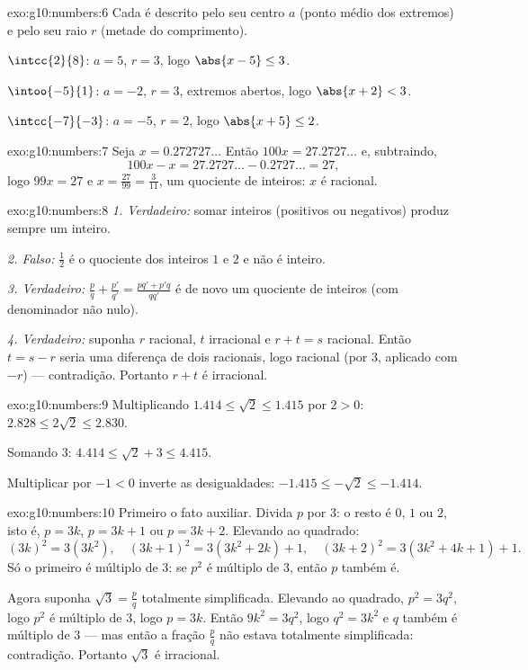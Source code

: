 \begin{solution}{exo:g10:numbers:6}
Cada  é descrito pelo seu centro $a$ (ponto médio dos extremos)
e pelo seu raio $r$ (metade do comprimento).

$\intcc{2}{8}$: $a = 5$, $r = 3$, logo $\abs{x - 5} \leq 3$.

$\intoo{-5}{1}$: $a = -2$, $r = 3$, extremos abertos, logo
$\abs{x + 2} < 3$.

$\intcc{-7}{-3}$: $a = -5$, $r = 2$, logo $\abs{x + 5} \leq 2$.
\end{solution}

\begin{solution}{exo:g10:numbers:7}
Seja $x = 0.272727\dots$ Então $100x = 27.2727\dots$ e, subtraindo,
\[
100x - x = 27.2727\dots - 0.2727\dots = 27,
\]
logo $99x = 27$ e $x = \frac{27}{99} = \frac{3}{11}$, um quociente de
inteiros: $x$ é racional.
\end{solution}

\begin{solution}{exo:g10:numbers:8}
\emph{1. Verdadeiro:} somar inteiros (positivos ou negativos) produz
sempre um inteiro.

\emph{2. Falso:} $\frac{1}{2}$ é o quociente dos inteiros $1$ e $2$ e não
é inteiro.

\emph{3. Verdadeiro:} $\frac pq + \frac{p'}{q'} = \frac{pq' + p'q}{qq'}$ é
de novo um quociente de inteiros (com denominador não nulo).

\emph{4. Verdadeiro:} suponha $r$ racional, $t$ irracional e $r + t = s$
racional. Então $t = s - r$ seria uma diferença de dois racionais, logo
racional (por 3, aplicado com $-r$) --- contradição. Portanto $r + t$ é
irracional.
\end{solution}

\begin{solution}{exo:g10:numbers:9}
Multiplicando $1.414 \leq \sqrt2 \leq 1.415$ por $2 > 0$:
$2.828 \leq 2\sqrt2 \leq 2.830$.

Somando $3$: $4.414 \leq \sqrt2 + 3 \leq 4.415$.

Multiplicar por $-1 < 0$ inverte as desigualdades:
$-1.415 \leq -\sqrt2 \leq -1.414$.
\end{solution}

\begin{solution}{exo:g10:numbers:10}
Primeiro o fato auxiliar. Divida $p$ por $3$: o resto é $0$, $1$ ou $2$,
isto é, $p = 3k$, $p = 3k+1$ ou $p = 3k+2$. Elevando ao quadrado:
\[
(3k)^2 = 3(3k^2), \quad
(3k+1)^2 = 3(3k^2 + 2k) + 1, \quad
(3k+2)^2 = 3(3k^2 + 4k + 1) + 1 .
\]
Só o primeiro é múltiplo de $3$: se $p^2$ é múltiplo de $3$, então $p$
também é.

Agora suponha $\sqrt3 = \frac pq$ totalmente simplificada. Elevando ao
quadrado, $p^2 = 3q^2$, logo $p^2$ é múltiplo de $3$, logo $p = 3k$.
Então $9k^2 = 3q^2$, logo $q^2 = 3k^2$ e $q$ também é múltiplo de $3$ ---
mas então a fração $\frac pq$ não estava totalmente simplificada:
contradição. Portanto $\sqrt3$ é irracional.
\end{solution}

